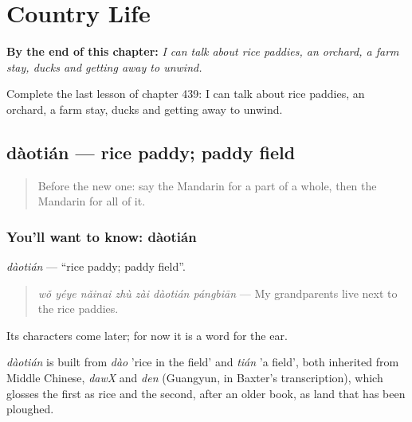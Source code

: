 
\chapter{Country Life}
\label{ch:zh-country-life}

\begin{chapteropening}
\textbf{By the end of this chapter:} \emph{I can talk about rice paddies, an orchard, a farm stay, ducks and getting away to unwind.}

Complete the last lesson of chapter 439: I can talk about rice paddies, an orchard, a farm stay, ducks and getting away to unwind.
\end{chapteropening}

\section[dàotián]{dàotián — rice paddy; paddy field}

\label{lesson:ZH-C439-daotian}



\begin{quote}
Before the new one: say the Mandarin for a part of a whole, then the Mandarin for all of it.
\end{quote}

\subsection*{You'll want to know: dàotián}
\emph{dàotián} — \textquotedblleft{}rice paddy; paddy field\textquotedblright{}.

\begin{quote}
\emph{wǒ yéye nǎinai zhù zài dàotián pángbiān} — My grandparents live next to the rice paddies.
\end{quote}

Its characters come later; for now it is a word for the ear.

\begin{cousinweb}
\emph{dàotián} is built from \emph{dào} 'rice in the field' and \emph{tián} 'a field', both inherited from Middle Chinese, \emph{dawX} and \emph{den} (Guangyun, in Baxter's transcription), which glosses the first as rice and the second, after an older book, as land that has been ploughed.
\end{cousinweb}

